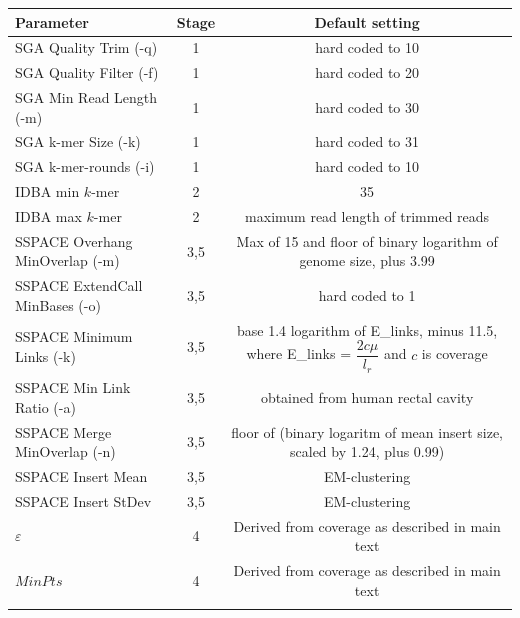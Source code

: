 \documentclass{bioinfo}
\begin{document}
\begin{table}[!t]
{\begin{tabular}{l|c|c}\toprule
Parameter                       & Stage & Default setting  \\\midrule
SGA Quality Trim (-q)           & 1     & hard coded to 10 \\
SGA Quality Filter (-f)         & 1     & hard coded to 20  \\
SGA Min Read Length (-m)        & 1     & hard coded to 30 \\
SGA k-mer Size (-k)             & 1     & hard coded to 31 \\
SGA k-mer-rounds (-i)           & 1     & hard coded to 10\\
IDBA min $k$-mer                & 2     & 35 \\
IDBA max $k$-mer                & 2     & maximum read length of trimmed reads \\
SSPACE Overhang MinOverlap (-m) & 3,5   & Max of 15 and floor of binary logarithm of genome size, plus 3.99  \\
SSPACE ExtendCall MinBases (-o) & 3,5   & hard coded to 1 \\
SSPACE Minimum Links (-k)       & 3,5   & base 1.4 logarithm of E\_links, minus 11.5, where E\_links = $\dfrac{2c\mu}{l_r}$ and $c$ is coverage \\
SSPACE Min Link Ratio (-a)      & 3,5   & obtained from human rectal cavity \\
SSPACE Merge MinOverlap (-n)    & 3,5   & floor of (binary logaritm of mean insert size, scaled by 1.24, plus 0.99) \\
SSPACE Insert Mean 	        & 3,5   & EM-clustering \\
SSPACE Insert StDev             & 3,5   & EM-clustering \\
$\varepsilon$                   & 4     & Derived from coverage as described in main text \\
$MinPts$                        & 4     & Derived from coverage as described in main text \\
\botrule \\
\end{tabular}}{}
\end{table}
\end{document}
